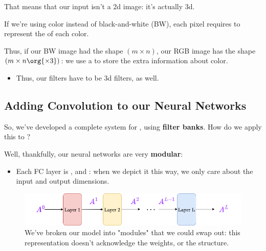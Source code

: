         That means that our input isn't a 2d image: it's actually 3d.\\

        \begin{concept}
            If we're using  color instead of black-and-white (BW), each pixel requires  to represent the  of each color.

            Thus, if our BW image had the shape $(m \times n)$, our RGB image has the shape $(m \times n \org{\times 3})$: we use a  to store the extra information about color.

            \begin{itemize}
                \item Thus, our filters have to be 3d filters, as well.
            \end{itemize}
        \end{concept}

    \pagebreak

    \subsection{Adding Convolution to our Neural Networks}

        So, we've developed a complete system for , using \textbf{filter banks}. How do we apply this to ?

        Well, thankfully, our neural networks are very \textbf{modular}: 

        \begin{itemize}
            \item Each FC layer is , and : when we depict it this way, we only care about the input and output dimensions.
        \end{itemize}

        \begin{figure}[H]
            \includegraphics[width=\textwidth]{images/nn_images/all_layers.png}
            \caption*{We've broken our model into "modules" that we could swap out: this representation doesn't acknowledge the weights, or the structure.}
        \end{figure}

